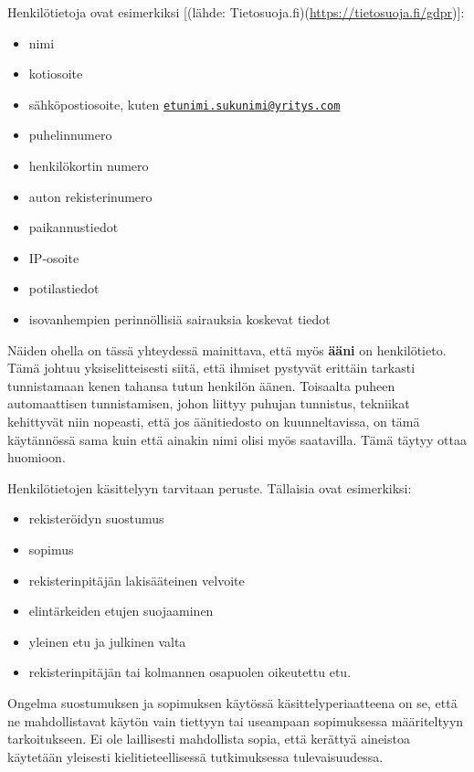 \documentclass[]{book}
\providecommand{\tightlist}{%
  \setlength{\itemsep}{0pt}\setlength{\parskip}{0pt}}
\begin{document}
Henkilötietoja ovat esimerkiksi {[}(lähde:
Tietosuoja.fi)(\url{https://tietosuoja.fi/gdpr}){]}:

\begin{itemize}
\tightlist
\item
  nimi
\item
  kotiosoite
\item
  sähköpostiosoite, kuten
  \href{mailto:etunimi.sukunimi@yritys.com}{\nolinkurl{etunimi.sukunimi@yritys.com}}
\item
  puhelinnumero
\item
  henkilökortin numero
\item
  auton rekisterinumero
\item
  paikannustiedot
\item
  IP-osoite
\item
  potilastiedot
\item
  isovanhempien perinnöllisiä sairauksia koskevat tiedot
\end{itemize}

Näiden ohella on tässä yhteydessä mainittava, että myös \textbf{ääni} on
henkilötieto. Tämä johtuu yksiselitteisesti siitä, että ihmiset pystyvät
erittäin tarkasti tunnistamaan kenen tahansa tutun henkilön äänen.
Toisaalta puheen automaattisen tunnistamisen, johon liittyy puhujan
tunnistus, tekniikat kehittyvät niin nopeasti, että jos äänitiedosto on
kuunneltavissa, on tämä käytännössä sama kuin että ainakin nimi olisi
myös saatavilla. Tämä täytyy ottaa huomioon.

Henkilötietojen käsittelyyn tarvitaan peruste. Tällaisia ovat
esimerkiksi:

\begin{itemize}
\tightlist
\item
  rekisteröidyn suostumus
\item
  sopimus
\item
  rekisterinpitäjän lakisääteinen velvoite
\item
  elintärkeiden etujen suojaaminen
\item
  yleinen etu ja julkinen valta
\item
  rekisterinpitäjän tai kolmannen osapuolen oikeutettu etu.
\end{itemize}

Ongelma suostumuksen ja sopimuksen käytössä käsittelyperiaatteena on se,
että ne mahdollistavat käytön vain tiettyyn tai useampaan sopimuksessa
määriteltyyn tarkoitukseen. Ei ole laillisesti mahdollista sopia, että
kerättyä aineistoa käytetään yleisesti kielitieteellisessä tutkimuksessa
tulevaisuudessa.
\end{document}
